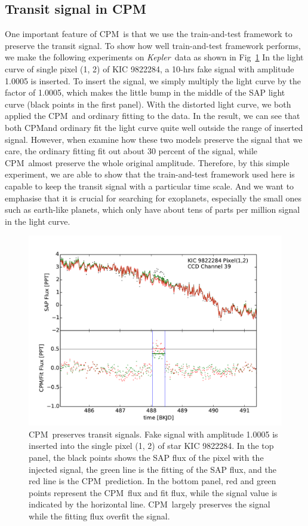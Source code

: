 \documentclass[12pt, preprint]{aastex}
\newcommand{\project}[1]{\textsl{#1}}
\newcommand{\Kepler}{\project{Kepler}}
\newcommand{\name}{CPM}
\begin{document}
\subsection{Transit signal in \name}
One important feature of \name\ is that we use the train-and-test framework to preserve 
the transit signal. To show how well train-and-test framework performs, we make the
following experiments on \Kepler\ data as shown in Fig~\ref{distortion}
In the light curve of single pixel (1, 2) of KIC 9822284, a 10-hrs fake signal 
with amplitude 1.0005 is inserted. To insert the signal, we simply multiply the light curve 
by the factor of 1.0005, which makes the little bump in the middle of the SAP light curve 
(black points in the first panel). With the distorted light curve, we both applied the 
\name\ and ordinary fitting to the data. In the result, we can see that both \name and 
ordinary fit the light curve quite well outside the range of inserted signal. However, 
when examine how these two models preserve the signal that we care, the ordinary
fitting fit out about 30 percent of the signal, while \name\ almost preserve the whole 
original amplitude. Therefore,  by this simple experiment, we are able to show that 
the train-and-test framework used here is capable to keep the transit signal with 
a particular time scale. And we want to emphasise that it is crucial for searching for
exoplanets, especially the small ones such as earth-like planets, which only have  
about tens of parts per million signal in the light curve.

\begin{figure}[htb]
\centering
\includegraphics[width=\columnwidth]{distortion_9822284_normal}
\caption{\label{distortion} \name\ preserves transit signals. 
Fake signal with amplitude 1.0005 is inserted into the single pixel (1, 2) of star KIC 9822284. 
In the top panel, the black points shows the SAP flux of the pixel with the injected signal, 
the green line is the fitting of the SAP flux, and the red line is the \name\ prediction. 
In the bottom panel, red and green points represent the \name\ flux and fit flux, 
while the signal value is indicated by the horizontal line. 
\name\ largely preserves the signal while the fitting flux overfit the signal.}
\end{figure}
\end{document}
